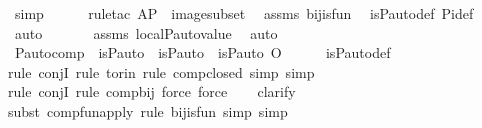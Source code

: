 \begin{isabellebody}
\ simp\isanewline
\ \ \ \ \isamarkupfalse%
\ {\isacharparenleft}{\kern0pt}rule{\isacharunderscore}{\kern0pt}tac\ A{\isacharequal}{\kern0pt}P\ \ image{\isacharunderscore}{\kern0pt}subset{\isacharparenright}{\kern0pt}\ \isamarkupfalse%
\ assms\ bij{\isacharunderscore}{\kern0pt}is{\isacharunderscore}{\kern0pt}fun\ \isamarkupfalse%
\ is{\isacharunderscore}{\kern0pt}P{\isacharunderscore}{\kern0pt}auto{\isacharunderscore}{\kern0pt}def\ Pi{\isacharunderscore}{\kern0pt}def\ \isamarkupfalse%
\ auto\ \isanewline
\ \ \ \ \isamarkupfalse%
\ assms\ local{\isachardot}{\kern0pt}P{\isacharunderscore}{\kern0pt}auto{\isacharunderscore}{\kern0pt}value\ \isamarkupfalse%
\ auto\ \isanewline
{}\isamarkupfalse%
%
\endisatagproof
{\isafoldproof}%
%
\isadelimproof
\isanewline
%
\endisadelimproof
\isanewline
{}\isamarkupfalse%
\ P{\isacharunderscore}{\kern0pt}auto{\isacharunderscore}{\kern0pt}comp\ {\isacharcolon}{\kern0pt}\ {\isachardoublequoteopen}is{\isacharunderscore}{\kern0pt}P{\isacharunderscore}{\kern0pt}auto{\isacharparenleft}{\kern0pt}{\isasympi}{\isacharparenright}{\kern0pt}\ {\isasymLongrightarrow}\ is{\isacharunderscore}{\kern0pt}P{\isacharunderscore}{\kern0pt}auto{\isacharparenleft}{\kern0pt}{\isasymtau}{\isacharparenright}{\kern0pt}\ {\isasymLongrightarrow}\ is{\isacharunderscore}{\kern0pt}P{\isacharunderscore}{\kern0pt}auto{\isacharparenleft}{\kern0pt}{\isasympi}\ O\ {\isasymtau}{\isacharparenright}{\kern0pt}{\isachardoublequoteclose}\ \isanewline
%
\isadelimproof
\ \ %
\endisadelimproof
%
\isatagproof
{}\isamarkupfalse%
\ is{\isacharunderscore}{\kern0pt}P{\isacharunderscore}{\kern0pt}auto{\isacharunderscore}{\kern0pt}def\ \isanewline
\ \ \isamarkupfalse%
{\isacharparenleft}{\kern0pt}rule\ conjI{\isacharcomma}{\kern0pt}\ rule\ to{\isacharunderscore}{\kern0pt}rin{\isacharcomma}{\kern0pt}\ rule\ comp{\isacharunderscore}{\kern0pt}closed{\isacharcomma}{\kern0pt}\ simp{\isacharcomma}{\kern0pt}\ simp{\isacharparenright}{\kern0pt}\isanewline
\ \ \isamarkupfalse%
{\isacharparenleft}{\kern0pt}rule\ conjI{\isacharcomma}{\kern0pt}\ rule\ comp{\isacharunderscore}{\kern0pt}bij{\isacharcomma}{\kern0pt}\ force{\isacharcomma}{\kern0pt}\ force{\isacharparenright}{\kern0pt}\isanewline
\ \ \isamarkupfalse%
\ clarify\ \isanewline
\ \ \isamarkupfalse%
{\isacharparenleft}{\kern0pt}subst\ comp{\isacharunderscore}{\kern0pt}fun{\isacharunderscore}{\kern0pt}apply{\isacharcomma}{\kern0pt}\ rule\ bij{\isacharunderscore}{\kern0pt}is{\isacharunderscore}{\kern0pt}fun{\isacharcomma}{\kern0pt}\ simp{\isacharcomma}{\kern0pt}\ simp{\isacharparenright}{\kern0pt}\isanewline

\end{isabellebody}
